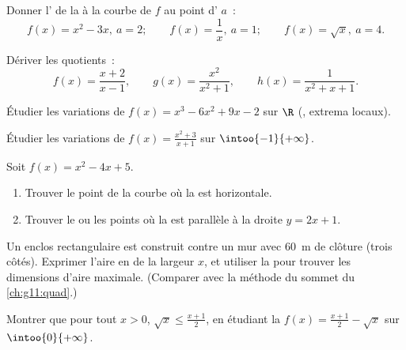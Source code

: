 \begin{exercise}[$\star$]\label{exo:g11:deriv:3}
Donner l' de la  à la courbe de $f$ au point d'
$a$~:
\[
f(x) = x^2 - 3x, \ a = 2; \qquad
f(x) = \frac1x, \ a = 1; \qquad
f(x) = \sqrt x, \ a = 4 .
\]
\end{exercise}

\begin{exercise}[$\star$]\label{exo:g11:deriv:4}
Dériver les quotients~:
\[
f(x) = \frac{x+2}{x-1}, \qquad
g(x) = \frac{x^2}{x^2+1}, \qquad
h(x) = \frac{1}{x^2 + x + 1} .
\]
\end{exercise}

\begin{exercise}[$\star\star$]\label{exo:g11:deriv:5}
Étudier les variations de $f(x) = x^3 - 6x^2 + 9x - 2$ sur $\R$ (, extrema locaux).
\end{exercise}

\begin{exercise}[$\star\star$]\label{exo:g11:deriv:6}
Étudier les variations de $f(x) = \frac{x^2 + 3}{x + 1}$ sur
$\intoo{-1}{+\infty}$.
\end{exercise}

\begin{exercise}[$\star\star$]\label{exo:g11:deriv:7}
Soit $f(x) = x^2 - 4x + 5$.
\begin{enumerate}
  \item Trouver le point de la courbe où la  est horizontale.
  \item Trouver le ou les points où la  est parallèle à la
        droite $y = 2x + 1$.
\end{enumerate}
\end{exercise}

\begin{exercise}[$\star\star$]\label{exo:g11:deriv:8}
Un enclos rectangulaire est construit contre un mur avec $60$~m de
clôture (trois côtés). Exprimer l'aire en  de la largeur $x$, et
utiliser la  pour trouver les dimensions d'aire maximale.
(Comparer avec la méthode du sommet du \cref{ch:g11:quad}.)
\end{exercise}

\begin{exercise}[$\star\star$]\label{exo:g11:deriv:9}
Montrer que pour tout $x > 0$, $\sqrt{x} \leq \frac{x + 1}{2}$, en
étudiant la  $f(x) = \frac{x+1}{2} - \sqrt x$ sur
$\intoo{0}{+\infty}$.
\end{exercise}

